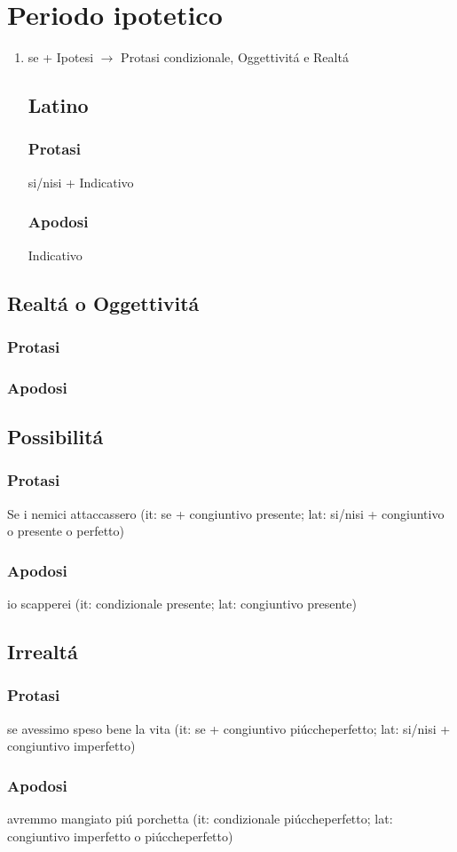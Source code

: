 \documentclass{article}
\title{\jobname}
\author{Eugenio Animali}
\begin{document}
\maketitle


\section{Periodo ipotetico}
\begin{enumerate}
\item se + Ipotesi $\to$ Protasi condizionale, Oggettivitá e Realtá
\subsection{Latino}

\subsubsection{Protasi}
si/nisi + Indicativo
\subsubsection{Apodosi}
Indicativo

\end{enumerate}
\subsection{Realtá o Oggettivitá}
\subsubsection{Protasi}
\subsubsection{Apodosi}
\subsection{Possibilitá}
\subsubsection{Protasi}
Se i nemici attaccassero (it: se + congiuntivo presente; lat: si/nisi + congiuntivo o presente o perfetto)
\subsubsection{Apodosi}
io scapperei (it: condizionale presente; lat: congiuntivo presente)
\subsection{Irrealtá}
\subsubsection{Protasi}
se avessimo speso bene la vita (it: se + congiuntivo piúccheperfetto; lat: si/nisi + congiuntivo imperfetto)
\subsubsection{Apodosi}
avremmo mangiato piú porchetta (it: condizionale piúccheperfetto; lat: congiuntivo imperfetto o piúccheperfetto)
\end{document}
